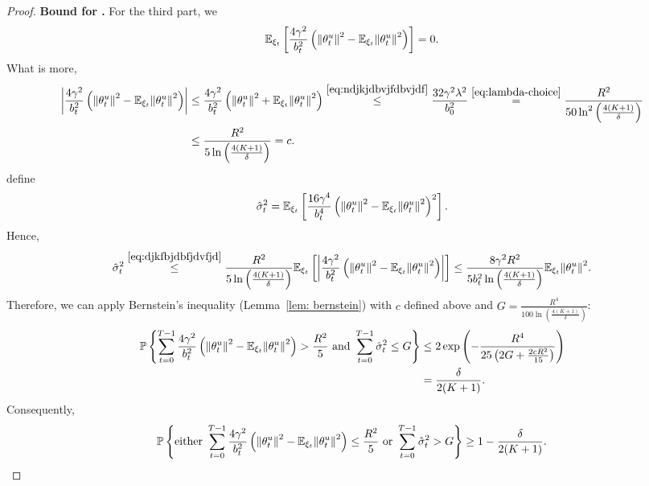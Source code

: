 \documentclass{article}
\begin{document}
\begin{proof}
    \textbf{Bound for \circledThree.} For the third part, we 
    \begin{align*}
        {\mathbb E}_{\xi_t}\left[\frac{4\gamma^2}{b_t^2}\left({\left\lVert\theta_t^u\right\rVert}^2 - {\mathbb E}_{\xi_t}{\left\lVert\theta_t^u\right\rVert}^2\right)\right] = 0.
    \end{align*}
    What is more, 
    \begin{align}
        \left|\frac{4\gamma^2}{b_t^2}\left({\left\lVert\theta_t^u\right\rVert}^2 - {\mathbb E}_{\xi_t}{\left\lVert\theta_t^u\right\rVert}^2\right)\right| &\leq \frac{4\gamma^2}{b_t^2}\left({\left\lVert\theta_t^u\right\rVert}^2 + {\mathbb E}_{\xi_t}{\left\lVert\theta_t^u\right\rVert}^2\right) \overset{\eqref{eq:ndjkjdbvjfdbvjdf}}{\leq} \frac{32\gamma^2\lambda^2}{b_0^2} \overset{\eqref{eq:lambda-choice}}{=} \frac{R^2}{50\ln^2\left(\frac{4(K+1)}{\delta}\right)} \notag \\
        &\leq \frac{R^2}{5\ln\left(\frac{4(K+1)}{\delta}\right)} = c. \label{eq:djkfbjdbfjdvfjd}
    \end{align}
     define 
    \begin{align*}
        \hat{\sigma}_t^2 = {\mathbb E}_{\xi_t}\left[\frac{16\gamma^4}{b_t^4}\left({\left\lVert\theta_t^u\right\rVert}^2 - {\mathbb E}_{\xi_t}{\left\lVert\theta_t^u\right\rVert}^2\right)^2\right].
    \end{align*}
    Hence, 
    \begin{align*}
        \hat{\sigma}_t^2 \overset{\eqref{eq:djkfbjdbfjdvfjd}}{\leq} \frac{R^2}{5\ln\left(\frac{4(K+1)}{\delta}\right)}{\mathbb E}_{\xi_t}\left[\left|\frac{4\gamma^2}{b_t^2}\left({\left\lVert\theta_t^u\right\rVert}^2 - {\mathbb E}_{\xi_t}{\left\lVert\theta_t^u\right\rVert}^2\right)\right|\right] \leq \frac{8\gamma^2R^2}{5b_t^2\ln\left(\frac{4(K+1)}{\delta}\right)}{\mathbb E}_{\xi_t}{\left\lVert\theta_t^u\right\rVert}^2.
    \end{align*}
    Therefore, 
    we can apply Bernstein's inequality (Lemma~\ref{lem: bernstein}) with $c$ defined above and $G = \frac{R^{4}}{100\ln\left(\frac{4(K+1)}{\delta}\right)}$:
    \begin{align*}
        \mathbb{P}\left\{\sum\limits_{t=0}^{T-1} \frac{4\gamma^2}{b_t^2}\left({\left\lVert\theta_t^u\right\rVert}^2 - {\mathbb E}_{\xi_t}{\left\lVert\theta_t^u\right\rVert}^2\right) > \frac{R^2}{5} \text{ and } \sum\limits_{t=0}^{T-1}\hat{\sigma}_t^2 \leq G \right\} &\leq 2\exp\left(-\frac{R^4}{25\left(2G + \frac{2cR^2}{15}\right)}\right) \\&= \frac{\delta}{2(K+1)}.
    \end{align*}
    Consequently,
    \begin{align*}
        \mathbb{P}\left\{\text{either }\sum\limits_{t=0}^{T-1} \frac{4\gamma^2}{b_t^2}\left(\sqn{\theta_t^u} - \E_{\xi_t}\sqn{\theta_t^u}\right) \leq \frac{R^2}{5} \text{ or } \sum\limits_{t=0}^{T-1}\hat{\sigma}_t^2 > G \right\} \geq 1 - \frac{\delta}{2(K+1)}.

\end{align*}
\end{proof}
\end{document}
